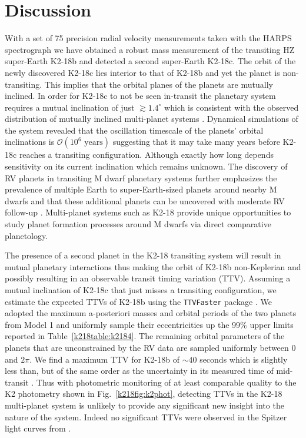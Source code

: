 \section{Discussion} \label{k218sect:disc}
With a set of 75 precision radial velocity measurements taken with the HARPS spectrograph
we have obtained a robust mass measurement of the transiting HZ super-Earth K2-18b and
detected a second super-Earth K2-18c. The orbit of the newly discovered K2-18c lies
interior to that of K2-18b and yet the planet is non-transiting. This implies that the orbital
planes of the planets are mutually inclined. In order for K2-18c
to not be seen in-transit the planetary system requires a mutual inclination of just
$\gtrsim 1.4^{\circ}$ which is consistent with the observed distribution of mutually inclined
multi-planet systems \citep{figueira12, fabrycky14}. Dynamical simulations of the system
revealed that the oscillation timescale of the planets' orbital inclinations is
$\mathcal{O}(10^6 \text{ years})$ suggesting that it may take many years before K2-18c reaches a transiting
configuration. Although exactly how long depends sensitivity on its current inclination which remains
unknown. The discovery of RV planets in transiting M dwarf planetary systems 
further emphasizes the prevalence of multiple Earth to super-Earth-sized planets around
nearby M dwarfs and that these additional planets can be uncovered with moderate RV follow-up
\citep{cloutier17a}. Multi-planet systems such as K2-18 provide unique opportunities to study
planet formation processes around M dwarfs via direct comparative planetology. 

The presence of a second planet in the K2-18 transiting system will result in mutual 
planetary interactions thus making the orbit of K2-18b non-Keplerian and possibly resulting
in an observable transit timing variation (TTV). Assuming a mutual inclination of K2-18c
that just misses a transiting configuration, we estimate the expected TTVs 
of K2-18b using the \texttt{TTVFaster} package \citep{deck14, agol16}. We adopted the maximum a-posteriori
masses and orbital periods of the two planets from Model 1 and uniformly sample their
eccentricities up the 99\%
upper limits reported in Table~\ref{k218table:k2184}. The remaining orbital parameters of the planets that
are unconstrained by the RV data 
are sampled uniformly between 0 and $2\pi$. We find a maximum TTV for K2-18b of $\sim 40$
seconds which is slightly less than, but of the same order as the uncertainty in its measured
time of mid-transit .
Thus with photometric monitoring of at least comparable quality to the K2 photometry
shown in Fig.~\ref{k218fig:k2phot}, detecting TTVs in the K2-18 multi-planet system is unlikely to provide
any significant new insight into the nature of the system. Indeed no significant TTVs were observed in
the Spitzer light curves from .

